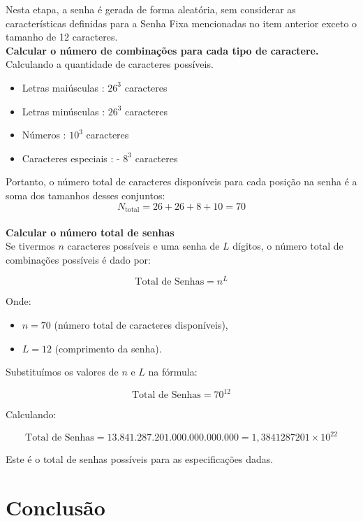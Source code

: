 \documentclass{article}
\begin{document}
Nesta etapa, a senha é gerada de forma aleatória, sem considerar as características definidas para a Senha Fixa mencionadas no item anterior exceto o tamanho de 12 caracteres.\\

\textbf{Calcular o número de combinações para cada tipo de caractere.}\\
Calculando a quantidade de caracteres possíveis.
\begin{itemize}
	\item Letras maiúsculas : $26^3$ caracteres
	\item Letras minúsculas : $26^3$ caracteres
	\item Números : $10^3$ caracteres
	\item Caracteres especiais :  - $8^3$ caracteres
\end{itemize}

Portanto, o número total de caracteres disponíveis para cada posição na senha é a soma dos tamanhos desses conjuntos:\\

\[
N_{\text{total}} = 26 + 26 + 8 + 10 = 70
\]\\

\textbf{Calcular o número total de senhas}\\

Se tivermos \( n \) caracteres possíveis e uma senha de \( L \) dígitos, o número total de combinações possíveis é dado por:

\[
\text{Total de Senhas} = n^L
\]

Onde:
\begin{itemize}
    \item \( n = 70 \) (número total de caracteres disponíveis),
    \item \( L = 12 \) (comprimento da senha).
\end{itemize}

Substituímos os valores de \( n \) e \( L \) na fórmula:

\[
\text{Total de Senhas} = 70^{12}
\]

Calculando:

\[
\text{Total de Senhas} = 13.841.287.201.000.000.000.000 = 1,3841287201 \times 10^{22}
\]

Este é o total de senhas possíveis para as especificações dadas.

\pagebreak

\section{Conclusão}
\end{document}
